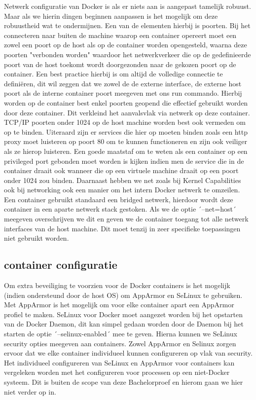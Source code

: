Netwerk configuratie van Docker is als er niets aan is aangepast tamelijk robuust. Maar als we hierin dingen beginnen aanpassen is het mogelijk om deze robuustheid wat te ondermijnen. Een van de elementen hierbij is poorten. Bij het connecteren naar buiten de machine waarop een container opereert moet een zowel een poort op de host als op de container worden opengesteld, waarna deze poorten "verbonden worden" waardoor het netwerkverkeer die op de gedefinieerde poort van de host toekomt wordt doorgezonden naar de gekozen poort op de container. Een best practice hierbij is om altijd de volledige connectie te definiëren, dit wil zeggen dat we zowel de de externe interface, de externe host poort als de interne container poort meegeven met ons run commando. Hierbij worden op de container best enkel poorten geopend die effectief gebruikt worden door deze container. Dit verkleind het aanvalsvlak via netwerk op deze container. TCP/IP poorten onder 1024 op de host machine worden best ook vermeden om op te binden. Uiteraard zijn er services die hier op moeten binden zoals een http proxy moet luisteren op poort 80 om te kunnen functioneren en zijn ook veiliger als ze hierop luisteren. Een goede maatstaf om te weten als een container op een privileged port gebonden moet worden is kijken indien men de service die in de container draait ook wanneer die op een virtuele machine draait op een poort onder 1024 zou binden. Daarnaast hebben we net zoals bij Kernel Capabilities ook bij networking ook een manier om het intern Docker netwerk te omzeilen. Een container gebruikt standaard een bridged netwerk, hierdoor wordt deze container in een aparte netwerk stack gestoken. Als we de optie ´--net=host´ meegeven overschrijven we dit en geven we de container toegang tot alle netwerk interfaces van de host machine. Dit moet tenzij in zeer specifieke toepassingen niet gebruikt worden.


\subsection{container configuratie}

Om extra beveiliging te voorzien voor de Docker containers is het mogelijk (indien ondersteund door de host OS) om AppArmor en SeLinux te gebruiken. Met AppArmor is het mogelijk om voor elke container apart een AppArmor profiel te maken. SeLinux voor Docker moet aangezet worden bij het opstarten van de Docker Daemon, dit kan simpel gedaan worden door de Daemon bij het starten de optie ´--selinux-enabled´ mee te geven. Hierna kunnen we SeLinux security opties meegeven aan containers. Zowel AppArmor en Selinux zorgen ervoor dat we elke container individueel kunnen configureren op vlak van security. Het individueel configureren van SeLinux en AppArmor voor containers kan vergeleken worden met het configureren voor processen op een niet-Docker systeem. Dit is buiten de scope van deze Bachelorproef en hierom gaan we hier niet verder op in.

